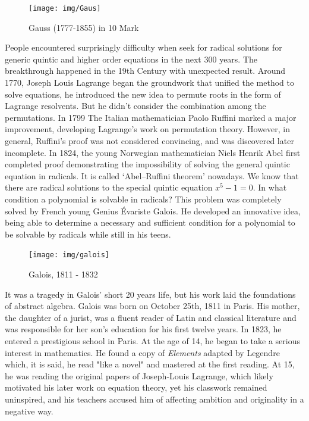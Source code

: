 \documentclass[b5paper]{article}
\begin{document}
\begin{figure}[htbp]
 \centering
 \texttt{[image: img/Gaus]}
 \captionsetup{labelformat=empty}
 \caption{Gauss (1777-1855) in 10 Mark}
 \label{fig:Gauss}
\end{figure}

People encountered surprisingly difficulty when seek for radical solutions for generic quintic and higher order equations in the next 300 years. The breakthrough happened in the 19th Century with unexpected result. Around 1770, Joseph Louis Lagrange began the groundwork that unified the method to solve equations, he introduced the new idea to permute roots in the form of Lagrange resolvents. But he didn't consider the combination among the permutations. In 1799 The Italian mathematician Paolo Ruffini marked a major improvement, developing Lagrange's work on permutation theory. However, in general, Ruffini's proof was not considered convincing, and was discovered later incomplete. In 1824, the young Norwegian mathematician Niels Henrik Abel first completed proof demonstrating the impossibility of solving the general quintic equation in radicals. It is called `Abel–Ruffini theorem' nowadays. We know that there are radical solutions to the special quintic equation $x^5-1=0$. In what condition a polynomial is solvable in radicals? This problem was completely solved by French young Genius Évariste Galois. He developed an innovative idea, being able to determine a necessary and sufficient condition for a polynomial to be solvable by radicals while still in his teens\cite{Wiki-Galois-theory}.

\begin{figure}[htbp]
 \centering
 \texttt{[image: img/galois]}
 \captionsetup{labelformat=empty}
 \caption{Galois, 1811 - 1832}
 \label{fig:Galois}
\end{figure}

It was a tragedy in Galois' short 20 years life, but his work laid the foundations of abstract algebra. Galois was born on October 25th, 1811 in Paris. His mother, the daughter of a jurist, was a fluent reader of Latin and classical literature and was responsible for her son's education for his first twelve years. In 1823, he entered a prestigious school in Paris. At the age of 14, he began to take a serious interest in mathematics. He found a copy of {\em Elements} adapted by Legendre which, it is said, he read "like a novel" and mastered at the first reading. At 15, he was reading the original papers of Joseph-Louis Lagrange, which likely motivated his later work on equation theory, yet his classwork remained uninspired, and his teachers accused him of affecting ambition and originality in a negative way.
\end{document}
